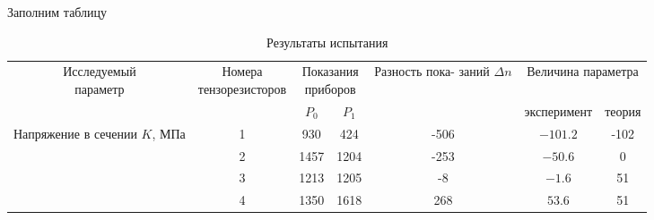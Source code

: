 Заполним таблицу
\begin{table}[!ht]
    \centering
    \caption{Результаты испытания}
    \label{tab:results}
    \begin{tabular}{|c|c|c|c|c|c|c|}
        \hline
        \multicolumn{1}{|c|}{\multirow{2}{*}{\parbox[c]{2.7cm}{Исследуемый\\параметр}}} & \multirow{2}{*}{\parbox[c]{3cm}{Номера\\тензорезисторов}} & \multicolumn{2}{c|}{\parbox[c]{2cm}{Показания\\приборов}} & \multirow{2}{*}{\parbox[c]{3cm}{Разность пока-\\заний $\Delta n$}} & \multicolumn{2}{c|}{Величина параметра}   \\ \cline{3-4} \cline{6-7} 
        \multicolumn{1}{|c|}{}                                                          &                                                           & $P_0$                 & $P_1$                             &                                                                    & \multicolumn{1}{c|}{эксперимент} & теория \\ \hline
        \multirow{5}{*}{\parbox[c]{2.7cm}{Напряжение в\\сечении $K$, МПа}}              & 1                                                         & 930                   & 424                               & -506                                                               & $-101.2$                         & -102   \\ \cline{2-7} 
                                                                                        & 2                                                         & 1457                  & 1204                              & -253                                                               & $-50.6$                          & 0      \\ \cline{2-7} 
                                                                                        & 3                                                         & 1213                  & 1205                              & -8                                                                 & $-1.6$                           & 51     \\ \cline{2-7} 
                                                                                        & 4                                                         & 1350                  & 1618                              & 268                                                                & $53.6$                           & 51     \\ \cline{2-7} 

\end{tabular}
\end{table}
